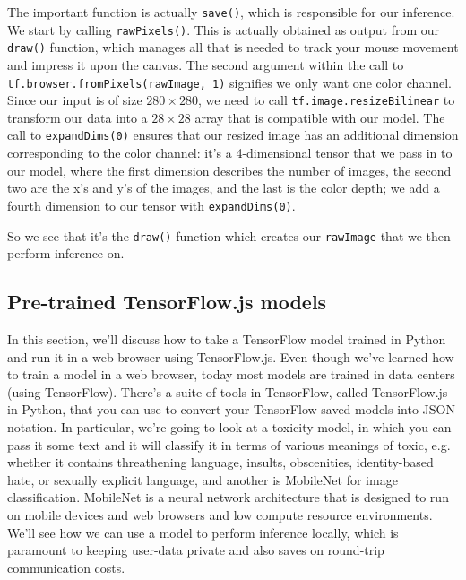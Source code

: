 \documentclass[12pt]{article}
\begin{document}
The important function is actually \texttt{save()}, which is responsible for our inference. We start by calling \texttt{rawPixels()}. This is actually obtained as output from our \texttt{draw()} function,
which manages all that is needed to track your mouse movement and impress it upon the canvas. 
The second argument within the call to \texttt{tf.browser.fromPixels(rawImage, 1)} signifies we only want one color channel. Since our input is of size $280 \times 280$, we need to call \texttt{tf.image.resizeBilinear} to transform our data into a $28 \times 28$ array that is compatible with our model. The call to \texttt{expandDims(0)} ensures that our resized image has an additional dimension corresponding to the color channel: it's a 4-dimensional tensor that we pass in to our model, where the first dimension describes the number of images, the second two are the x's and y's of the images, and the last is the color depth; we add a fourth dimension to our tensor with \texttt{expandDims(0)}. 


So we see that it's the \texttt{draw()} function which creates our \texttt{rawImage} that we then perform inference on.

\subsection{Pre-trained TensorFlow.js models}
In this section, we'll discuss how to take a TensorFlow model trained in Python and run it in a web browser using TensorFlow.js. Even though we've learned how to train a model in a web browser, today most models are trained in data centers (using TensorFlow). There's a suite of tools in TensorFlow, called TensorFlow.js in Python, that you can use to convert your TensorFlow saved models into JSON notation. In particular, we're going to look at a toxicity model, in which you can pass it some text and it will classify it in terms of various meanings of toxic, e.g. whether it contains threathening language, insults, obscenities, identity-based hate, or sexually explicit language, and another is MobileNet for image classification. MobileNet is a neural network architecture that is designed to run on mobile devices and web browsers and low compute resource environments. We'll see how we can use a model to perform inference locally, which is paramount to keeping user-data private and also saves on round-trip communication costs.
\end{document}
